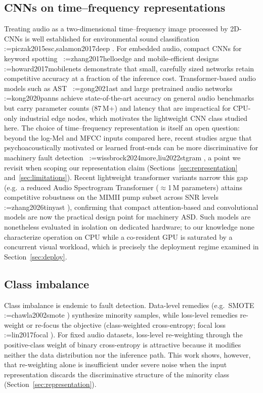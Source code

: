 \documentclass[review,nopreprintline]{elsarticle}
\makeatletter
\newif\ifmc@notfirst
\let\@oldcite\cite
\def\mc@splitcite#1{%
    \begingroup
    \mc@notfirstfalse
    \@for\@citekey:=#1\do{%
      \ifmc@notfirst, \fi
      \mc@notfirsttrue
      \@oldcite{\@citekey}%
    }%
    \endgroup
  }%
\def\cite#1{\protect\mc@splitcite{#1}}%
\makeatother
\begin{document}
\subsection{CNNs on time--frequency representations}
Treating audio as a two-dimensional time--frequency image processed by 2D-CNNs is well established for environmental sound classification~\cite{piczak2015esc,salamon2017deep}. For embedded audio, compact CNNs for keyword spotting~\cite{zhang2017helloedge} and mobile-efficient designs~\cite{howard2017mobilenets} demonstrate that small, carefully sized networks retain competitive accuracy at a fraction of the inference cost. Transformer-based audio models such as AST~\cite{gong2021ast} and large pretrained audio networks~\cite{kong2020panns} achieve state-of-the-art accuracy on general audio benchmarks but carry parameter counts (87\,M+) and latency that are impractical for CPU-only industrial edge nodes, which motivates the lightweight CNN class studied here. The choice of time--frequency representation is itself an open question: beyond the log-Mel and MFCC inputs compared here, recent studies argue that psychoacoustically motivated or learned front-ends can be more discriminative for machinery fault detection~\cite{wissbrock2024more,liu2022stgram}, a point we revisit when scoping our representation claim (Sections~\ref{sec:representation} and~\ref{sec:limitations}). Recent lightweight transformer variants narrow this gap (e.g.\ a reduced Audio Spectrogram Transformer ($\approx$1\,M parameters) attains competitive robustness on the MIMII pump subset across SNR levels~\cite{zhang2026tinyast}), confirming that compact attention-based and convolutional models are now the practical design point for machinery ASD. Such models are nonetheless evaluated in isolation on dedicated hardware; to our knowledge none characterize operation on CPU while a co-resident GPU is saturated by a concurrent visual workload, which is precisely the deployment regime examined in Section~\ref{sec:deploy}.

\subsection{Class imbalance}
Class imbalance is endemic to fault detection. Data-level remedies (e.g.\ SMOTE~\cite{chawla2002smote}) synthesize minority samples, while loss-level remedies re-weight or re-focus the objective (class-weighted cross-entropy; focal loss~\cite{lin2017focal}). For fixed audio datasets, loss-level re-weighting through the positive-class weight of binary cross-entropy is attractive because it modifies neither the data distribution nor the inference path. This work shows, however, that re-weighting alone is insufficient under severe noise when the input representation discards the discriminative structure of the minority class (Section~\ref{sec:representation}).
\end{document}
